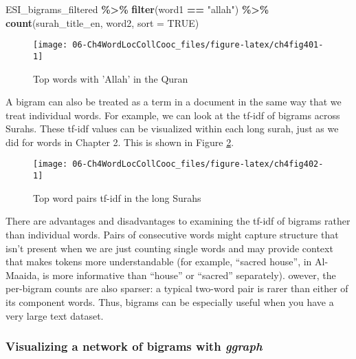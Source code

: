 \documentclass[
]{article}
\newenvironment{Shaded}{\begin{snugshade}}{\end{snugshade}}
\newcommand{\AttributeTok}[1]{\textcolor[rgb]{0.13,0.29,0.53}{#1}}
\newcommand{\ConstantTok}[1]{\textcolor[rgb]{0.56,0.35,0.01}{#1}}
\newcommand{\FunctionTok}[1]{\textcolor[rgb]{0.13,0.29,0.53}{\textbf{#1}}}
\newcommand{\NormalTok}[1]{#1}
\newcommand{\SpecialCharTok}[1]{\textcolor[rgb]{0.81,0.36,0.00}{\textbf{#1}}}
\newcommand{\StringTok}[1]{\textcolor[rgb]{0.31,0.60,0.02}{#1}}
\begin{document}
\footnotesize

\begin{Shaded}
\begin{Highlighting}[]
\NormalTok{ESI\_bigrams\_filtered }\SpecialCharTok{\%\textgreater{}\%}
        \FunctionTok{filter}\NormalTok{(word1 }\SpecialCharTok{==} \StringTok{"allah"}\NormalTok{) }\SpecialCharTok{\%\textgreater{}\%}
        \FunctionTok{count}\NormalTok{(surah\_title\_en, word2, }\AttributeTok{sort =} \ConstantTok{TRUE}\NormalTok{)}
\end{Highlighting}
\end{Shaded}

\begin{figure}

{\centering \texttt{[image: 06-Ch4WordLocCollCooc\_files/figure-latex/ch4fig401-1]} 

}

\caption{Top words with 'Allah' in the Quran}\label{fig:ch4fig401}
\end{figure}
\normalsize

A bigram can also be treated as a term in a document in the same way that we treat individual words. For example, we can look at the tf-idf of bigrams across Surahs. These tf-idf values can be visualized within each long surah, just as we did for words in Chapter 2. This is shown in Figure \ref{fig:ch4fig402}.

\begin{figure}

{\centering \texttt{[image: 06-Ch4WordLocCollCooc\_files/figure-latex/ch4fig402-1]} 

}

\caption{Top word pairs tf-idf in the long Surahs}\label{fig:ch4fig402}
\end{figure}

There are advantages and disadvantages to examining the tf-idf of bigrams rather than individual words. Pairs of consecutive words might capture structure that isn't present when we are just counting single words and may provide context that makes tokens more understandable (for example, ``sacred house'', in Al-Maaida, is more informative than ``house'' or ``sacred'' separately). owever, the per-bigram counts are also sparser: a typical two-word pair is rarer than either of its component words. Thus, bigrams can be especially useful when you have a very large text dataset.

\hypertarget{visualizing-a-network-of-bigrams-with-ggraph}{%
\subsubsection{\texorpdfstring{Visualizing a network of bigrams with \emph{ggraph}}{Visualizing a network of bigrams with ggraph}}\label{visualizing-a-network-of-bigrams-with-ggraph}}
\end{document}
